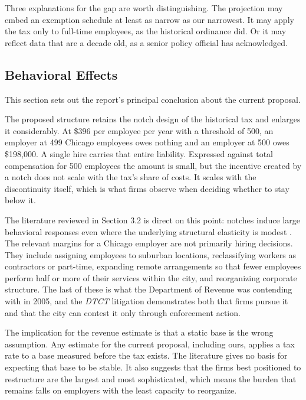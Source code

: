 \documentclass[12pt,letterpaper]{article}
\begin{document}
Three explanations for the gap are worth distinguishing. The projection may embed an exemption schedule at least as narrow as our narrowest. It may apply the tax only to full-time employees, as the historical ordinance did. Or it may reflect data that are a decade old, as a senior policy official has acknowledged.

\subsection{Behavioral Effects}

This section sets out the report's principal conclusion about the current proposal.

The proposed structure retains the notch design of the historical tax and enlarges it considerably. At \$396 per employee per year with a threshold of 500, an employer at 499 Chicago employees owes nothing and an employer at 500 owes \$198,000. A single hire carries that entire liability. Expressed against total compensation for 500 employees the amount is small, but the incentive created by a notch does not scale with the tax's share of costs. It scales with the discontinuity itself, which is what firms observe when deciding whether to stay below it.

The literature reviewed in Section 3.2 is direct on this point: notches induce large behavioral responses even where the underlying structural elasticity is modest \citep{kleven2013}. The relevant margins for a Chicago employer are not primarily hiring decisions. They include assigning employees to suburban locations, reclassifying workers as contractors or part-time, expanding remote arrangements so that fewer employees perform half or more of their services within the city, and reorganizing corporate structure. The last of these is what the Department of Revenue was contending with in 2005, and the \textit{DTCT} litigation demonstrates both that firms pursue it and that the city can contest it only through enforcement action.

The implication for the revenue estimate is that a static base is the wrong assumption. Any estimate for the current proposal, including ours, applies a tax rate to a base measured before the tax exists. The literature gives no basis for expecting that base to be stable. It also suggests that the firms best positioned to restructure are the largest and most sophisticated, which means the burden that remains falls on employers with the least capacity to reorganize.
\end{document}
